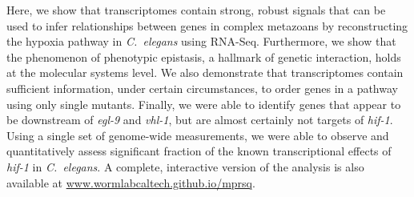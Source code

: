 \documentclass[9pt,twocolumn,twoside]{pnas-new}
\newcommand{\cel}{\emph{C.~elegans}}
\newcommand{\egl}{\emph{egl-9}}
\newcommand{\vhl}{\emph{vhl-1}}
\newcommand{\hif}{\emph{hif-1}}
\begin{document}
Here, we show that transcriptomes contain strong, robust signals that can be
used to infer relationships between genes in complex metazoans by reconstructing
the hypoxia pathway in \cel{} using RNA-Seq.
Furthermore, we show that the phenomenon of phenotypic epistasis, a hallmark of
genetic interaction, holds at the molecular systems level.
We also demonstrate that transcriptomes contain sufficient information, under
certain circumstances, to order genes in a pathway using only single mutants.
Finally, we were able to identify genes that appear to be downstream of \egl{}
and \vhl{}, but are almost certainly not targets of \hif{}.
Using a single set of genome-wide measurements, we were able to observe and
quantitatively assess  significant fraction of the known transcriptional
effects of \hif{} in \cel{}.
A complete, interactive version of the analysis is also available at
\url{www.wormlabcaltech.github.io/mprsq}.
\end{document}
